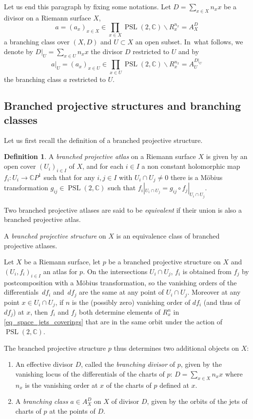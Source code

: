 \documentclass[10pt]{amsart}
\newcommand{\C}{\mathbb C}
\newcommand{\CP}{\mathbb CP}
\DeclareMathOperator{\PSL}{PSL}
\theoremstyle{definition}
\newtheorem{definition}{Definition}[subsection]
\theoremstyle{plain}
\begin{document}
Let us end this paragraph by fixing some notations.
Let $D = \sum_{x \in X} n_x x$ be a divisor on a Riemann surface $X$,
\[
a = (a_x)_{x \in X} \in \prod_{x \in X} \PSL(2, \C) \backslash R_{x}^{n_x} = A_X^D
\]
a branching class over $(X, D)$ and $U \subset X$ an open subset. In~what follows, we denote by $D|_U = \sum_{x \in U} n_x x$ the divisor $D$ restricted to $U$ and by
\[
a|_U = (a_x)_{x \in U} \in \prod_{x \in U} \PSL(2, \C) \backslash R_{x}^{n_x} = A_U^{D|_U}
\]
the branching class $a$ restricted to $U$.

\subsection{Branched projective structures and branching classes}

Let us first recall the definition of a branched projective structure.

\begin{definition}
A \emph{branched projective atlas} on a Riemann surface $X$ is given by an open cover $(U_i)_{i \in I}$ of $X$, and for each $i \in I$ a non constant holomorphic map $f_i: U_i \to \CP^1$ such that for any $i, j \in I$ with $U_i \cap U_j \neq 0$ there is a Möbius transformation $g_{ij} \in \PSL(2, \C)$ such that $f_i|_{U_i \cap U_j} = g_{ij} \circ f_j|_{U_i \cap U_j}$.

Two branched projective atlases are said to be \emph{equivalent} if their union is also a branched projective atlas.

A \emph{branched projective structure} on $X$ is an equivalence class of branched projective atlases.
\end{definition}

Let $X$ be a Riemann surface, let $p$ be a branched projective structure on $X$ and $(U_i, f_i)_{i \in I}$ an atlas for $p$.
On the intersections $U_i \cap U_j$, $f_i$ is obtained from $f_j$ by postcomposition with a Möbius transformation, so the vanishing orders of the differentials~$df_i$ and~$df_j$ are the same at any point of $U_i \cap U_j$.
Moreover at any point $x \in U_i \cap U_j$, if $n$ is the (possibly zero) vanishing order of $df_i$ (and thus of $df_j$) at $x$, then $f_i$ and $f_j$ both determine elements of $R_x^n$ in \eqref{eq_space_jets_coverings} that are in the same orbit under the action of $\PSL(2, \C)$.

The branched projective structure $p$ thus determines two additional objects on $X$:
\begin{enumerate}
\item
An effective divisor $D$, called the \emph{branching divisor} of $p$, given by the vanishing locus of the differentials of the charts of $p$: $D = \sum_{x \in X} n_x x$ where $n_x$ is the vanishing order at $x$ of the charts of $p$ defined at $x$.
\item
A \emph{branching class} $a \in A_X^D$ on $X$ of divisor $D$, given by the orbits of the jets of charts of $p$ at the points of $D$.
\end{enumerate}
\end{document}
